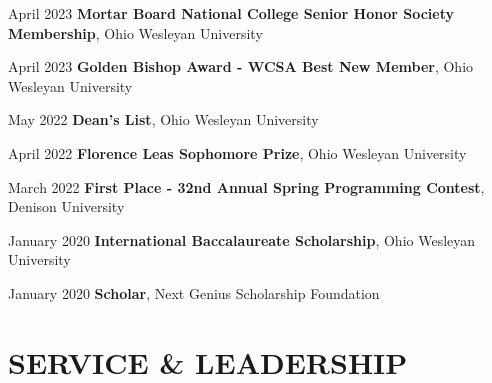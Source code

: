 \documentclass[10pt, letterpaper]{article}
\begin{document}
\begin{honorentry}
	{April 2023} %
	{\textbf{Mortar Board National College Senior Honor Society Membership}, Ohio Wesleyan University} %
\end{honorentry}

\begin{honorentry}
	{April 2023} %
	{\textbf{Golden Bishop Award - WCSA Best New Member}, Ohio Wesleyan University} %
\end{honorentry}

\begin{honorentry}
	{May 2022} %
	{\textbf{Dean's List}, Ohio Wesleyan University} %
\end{honorentry}

\begin{honorentry}
	{April 2022} %
	{\textbf{Florence Leas Sophomore Prize}, Ohio Wesleyan University} %
\end{honorentry}

\begin{honorentry}
	{March 2022} %
	{\textbf{First Place - 32nd Annual Spring Programming Contest}, Denison University} %
\end{honorentry}

\begin{honorentry}
	{January 2020} %
	{\textbf{International Baccalaureate Scholarship}, Ohio Wesleyan University} %
\end{honorentry}

\begin{honorentry}
	{January 2020} %
	{\textbf{Scholar}, Next Genius Scholarship Foundation} %
\end{honorentry}

\vspace{\headerSpacing}

\section{SERVICE \& LEADERSHIP}
\end{document}
